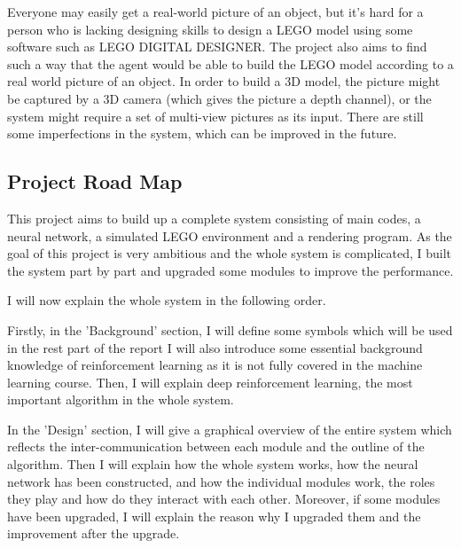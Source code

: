 \documentclass[a4paper]{article}
\begin{document}
            Everyone may easily get a real-world picture of an object, but it’s hard
            for a person who is lacking designing skills to design a LEGO model using
            some software such as LEGO DIGITAL DESIGNER. The project also aims to find
            such a way that the agent would be able to build the LEGO model according
            to a real world picture of an object. In order to build a 3D model, the
            picture might be captured by a 3D camera (which gives the picture a depth
            channel), or the system might require a set of multi-view pictures as its
            input. There are still some imperfections in the system, which can be
            improved in the future.
            
        \subsection{Project Road Map}
            This project aims to build up a complete system consisting of main codes,
            a neural network, a simulated LEGO environment and a rendering program.
            As the goal of this project is very ambitious and the whole system is
            complicated, I built the system part by part and upgraded some modules
            to improve the performance. 
            
            I will now explain the whole system in the following order. 
            
            Firstly, in the 'Background' section, I will define some symbols which
            will be used in the rest part of the report I will also introduce some
            essential background knowledge of reinforcement learning as it is not
            fully covered in the machine learning course. Then, I will explain deep
            reinforcement learning, the most important algorithm in the whole system. 
            
            In the 'Design' section, I will give a graphical overview of the entire
            system which reflects the inter-communication between each module and
            the outline of the algorithm. Then I will explain how the whole system
            works, how the neural network has been constructed, and how the individual
            modules work, the roles they play and how do they interact with each other.
            Moreover, if some modules have been upgraded, I will explain the reason why
            I upgraded them and the improvement after the upgrade. 
            
\end{document}
